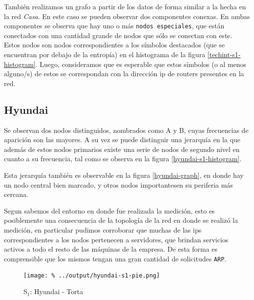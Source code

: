\documentclass[final,inline,a4paper,narroweqnarray]{ieee}
\let\Oldsubsection\subsection
\renewcommand{\subsection}{\FloatBarrier\Oldsubsection}
\begin{document}
  También realizamos un grafo a partir de los datos de forma similar a la
  hecha en la red \emph{Casa}. En este caso se pueden observar dos componentes
  conexas. En ambas componentes se observa que hay uno o más \texttt{nodos
  especiales}, que están conectados con una cantidad grande de nodos que
  sólo se conectan con este. Estos nodos son nodos correspondientes a
  los símbolos destacados (que se encuentran por debajo de la entropía) en
  el histograma de la figura \ref{techint-s1-histogram}. Luego, consideramos
  que es esperable que estos símbolos (o al menos alguno/s) de estos se
  correspondan con la dirección ip de routers presentes en la red.

  \subsection{Hyundai}

  Se observan dos nodos distinguidos, nombrados como A y B, cuyas frecuencias
  de aparición son las mayores. A su vez se puede distinguir una jerarquía en
  la que además de estos nodos primarios existe una serie de nodos de segundo
  nivel en cuanto a su frecuencia, tal como se observa en la figura
  \ref{hyundai-s1-histogram}.

  Esta jerarquía también es observable en la figura \ref{hyundai-graph}, en
  donde hay un nodo central bien marcado, y otros nodos importantesen su
  periferia más cercana.

  Segun sabemos del entorno en donde fue realizada la medición, esto es
  posiblemente una consecuencia de la topología de la red en donde se realizó
  la medición, en particular pudimos corroborar que muchas de las ips
  correspondientes a los nodos pertenecen a servidores, que brindan servicios
  activos a todo el resto de las máquinas de la empresa. De esta forma es
  comprensible que los mismos tengan una gran cantidad de solicitudes
  \texttt{ARP}.


    \begin{figure}[ht]\begin{center}
      \texttt{[image: \%
      ../output/hyundai-s1-pie.png]}
      \vspace{-2em}
      \caption{S$_1$: Hyundai - Torta}
      \label{hyundai-s1-pie}
    \end{center}\end{figure}
\end{document}
